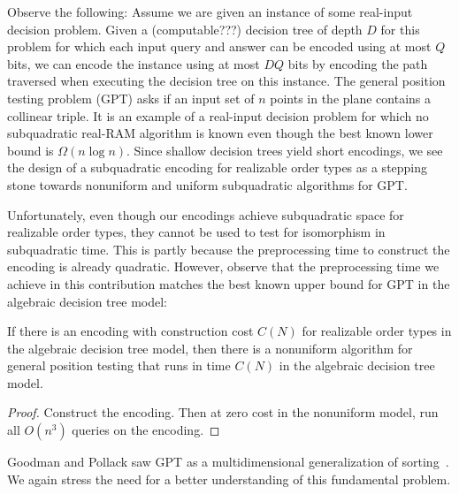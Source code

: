 Observe the following: Assume we are given an instance of some real-input
decision problem. Given a (computable???) decision tree of depth \(D\) for this problem for which
each input query and answer can be encoded using at most \(Q\) bits, we can
encode the instance using at most \(DQ\) bits by encoding the path traversed when
executing the decision tree on this instance. The general position testing
problem (GPT) asks if an input set of \(n\) points in the plane contains a
collinear triple. It is an example of a real-input decision problem for which
no subquadratic real-RAM algorithm is known even though the best known lower
bound is \(\Omega(n \log n)\). Since shallow decision trees yield short encodings,
we see the design of a subquadratic encoding for realizable order types as a
stepping stone towards nonuniform and uniform subquadratic algorithms for
GPT\@.

Unfortunately, even though our encodings achieve subquadratic space for
realizable order types, they cannot be used to test for isomorphism in
subquadratic time. This is partly because the preprocessing time to construct
the encoding is already quadratic.
%
However, observe that the preprocessing time we achieve in this contribution
matches the best known upper bound for GPT in the algebraic decision tree
model:
\begin{theorem}
  If there is an encoding with construction cost \(C(N)\) for
  realizable order types in the algebraic decision tree model, then
  there is a nonuniform algorithm for general position testing that runs
  in time \(C(N)\) in the algebraic decision tree model.
\end{theorem}
%
\begin{proof}
  Construct the encoding. Then at zero cost in the nonuniform
  model, run all \(O(n^3)\) queries on the encoding.
\end{proof}
%
Goodman and Pollack saw GPT as a multidimensional generalization of
sorting~\cite{GP83}.
%
We again stress the need for a better understanding of this fundamental
problem.
